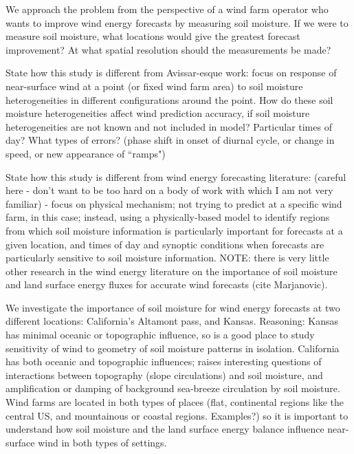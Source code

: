 \documentclass[12pt]{amsart}
\begin{document}
We approach the problem from the perspective of a wind farm operator who wants to improve wind energy forecasts by measuring soil moisture.  If we were to measure soil moisture, what locations would give the greatest forecast improvement?  At what spatial resolution should the measurements be made?

State how this study is different from Avissar-esque work: focus on response of near-surface wind at a point (or fixed wind farm area) to soil moisture heterogeneities in different configurations around the point.  How do these soil moisture heterogeneities affect wind prediction accuracy, if soil moisture heterogeneities are not known and not included in model?  Particular times of day?  What types of errors?  (phase shift in onset of diurnal cycle, or change in speed, or new appearance of ``ramps")

State how this study is different from wind energy forecasting literature: (careful here - don't want to be too hard on a body of work with which I am not very familiar) - focus on physical mechanism; not trying to predict at a specific wind farm, in this case; instead, using a physically-based model to identify regions from which soil moisture information is particularly important for forecasts at a given location, and times of day and synoptic conditions when forecasts are particularly sensitive to soil moisture information.  NOTE: there is very little other research in the wind energy literature on the importance of soil moisture and land surface energy fluxes for accurate wind forecasts (cite Marjanovic).

We investigate the importance of soil moisture for wind energy forecasts at two different locations: California's Altamont pass, and Kansas.  Reasoning: Kansas has minimal oceanic or topographic influence, so is a good place to study sensitivity of wind to geometry of soil moisture patterns in isolation.  California has both oceanic and topographic influences; raises interesting questions of interactions between topography (slope circulations) and soil moisture, and amplification or damping of background sea-breeze circulation by soil moisture.  Wind farms are located in both types of places (flat, continental regions like the central US, and mountainous or coastal regions. Examples?) so it is important to understand how soil moisture and the land surface energy balance influence near-surface wind in both types of settings.
\end{document}
